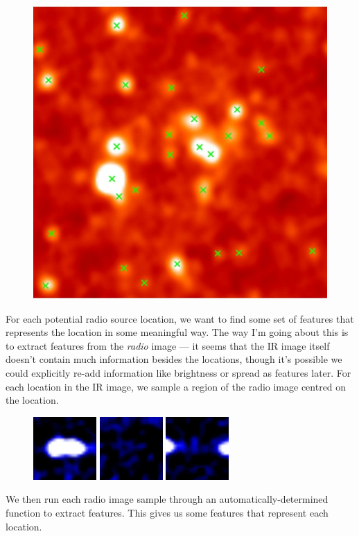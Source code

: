\documentclass[a4paper]{article}
\begin{document}
    \begin{figure}[!ht]
        \centering
        \includegraphics[width=0.3\linewidth]{images/ARG000180p_ir_potential_hosts.jpg}
    \end{figure}

    For each potential radio source location, we want to find some set of features that represents the location in some meaningful way. The way I'm going about this is to extract features from the \emph{radio} image --- it seems that the IR image itself doesn't contain much information besides the locations, though it's possible we could explicitly re-add information like brightness or spread as features later. For each location in the IR image, we sample a region of the radio image centred on the location.

    \begin{figure}[!ht]
        \centering
        \includegraphics[width=0.15\linewidth]{images/radio_neighbourhood_1.png}\quad
        \includegraphics[width=0.15\linewidth]{images/radio_neighbourhood_2.png}\quad
        \includegraphics[width=0.15\linewidth]{images/radio_neighbourhood_3.png}
    \end{figure}

    We then run each radio image sample through an automatically-determined function to extract features. This gives us some features that represent each location.
\end{document}
